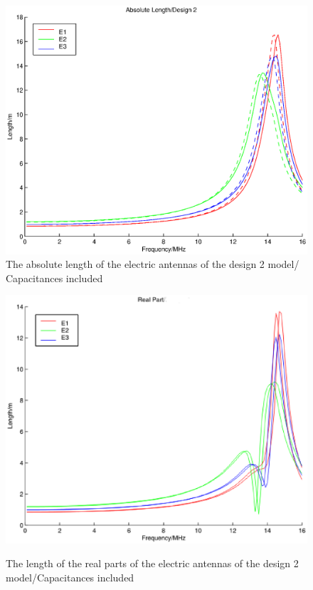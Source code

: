 \documentclass[a4paper,10pt]{thesis}
\begin{document}
\newpage
\begin{figure}
\begin{center}
\includegraphics[scale=0.45]{HeffLengthAbsD2_caps.eps}\\
\caption{The absolute length of the electric antennas of the  design 2 model/ Capacitances included} \label{fig_Heff_length_abs_caps_D2}
\includegraphics[scale=0.45]{HeffLengthRealD2_caps.eps} \\
\caption{The length of the real parts of the electric antennas of the  design 2 model/Capacitances included} \label{fig_Heff_length_real_caps_D2}

\end{center}
\end{figure}
\end{document}
